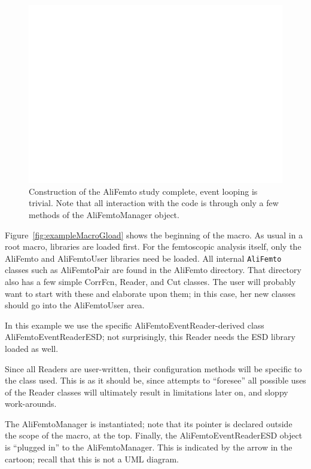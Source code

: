 \documentclass[twoside]{article}
\newcommand{\name}[1]{\textsf{#1}}%
\newcommand{\AliFemto}{{\tt AliFemto }}
\begin{document}
\begin{figure}[t]
\includegraphics[width=\textwidth]{ExampleMacro5.pdf}
\caption{Construction of the AliFemto study complete, event looping is trivial.  Note that all
interaction with the code is through only a few methods of the AliFemtoManager object.
\label{fig:exampleEventLoop}
}
\end{figure}

Figure~\ref{fig:exampleMacroGload} shows the beginning of the macro.  
As usual in a root macro, libraries are loaded first.  For the femtoscopic analysis itself, only the AliFemto and AliFemtoUser
libraries need be loaded.  All internal \AliFemto classes such as \name{AliFemtoPair} are found in the AliFemto directory.
That directory also has a few simple CorrFcn, Reader, and Cut classes.  The user will probably want to start with these and
elaborate upon them; in this case, her new classes should go into the AliFemtoUser area.

In this example
we use the specific \name{AliFemtoEventReader}-derived class \name{AliFemtoEventReaderESD}; not surprisingly, this Reader needs
the ESD library loaded as well.



Since all Readers are user-written, their configuration
methods will be specific to the class used.  This is as it should be, since attempts to ``foresee'' all possible
uses of the Reader classes will ultimately result in limitations later on, and sloppy work-arounds.

The \name{AliFemtoManager} is instantiated; note that its pointer is declared outside the scope of the macro, at the top.
Finally, the \name{AliFemtoEventReaderESD} object is ``plugged in'' to the \name{AliFemtoManager}.  This is indicated by the arrow
in the cartoon; recall that this is not a UML diagram.
\end{document}
